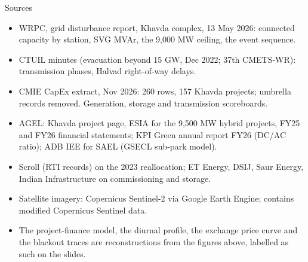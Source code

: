 \documentclass[10pt,aspectratio=169]{beamer}
\begin{document}
\begin{frame}[t]{Sources}
  {\scriptsize
  \begin{itemize}\setlength{\itemsep}{2pt}
    \item WRPC, grid disturbance report, Khavda complex, 13 May 2026: connected capacity by station, SVG MVAr, the 9,000 MW ceiling, the event sequence.
    \item CTUIL minutes (evacuation beyond 15 GW, Dec 2022; 37th CMETS-WR): transmission phases, Halvad right-of-way delays.
    \item CMIE CapEx extract, Nov 2026: 260 rows, 157 Khavda projects; umbrella records removed. Generation, storage and transmission scoreboards.
    \item AGEL: Khavda project page, ESIA for the 9,500 MW hybrid projects, FY25 and FY26 financial statements; KPI Green annual report FY26 (DC/AC ratio); ADB IEE for SAEL (GSECL sub-park model).
    \item Scroll (RTI records) on the 2023 reallocation; ET Energy, DSIJ, Saur Energy, Indian Infrastructure on commissioning and storage.
    \item Satellite imagery: Copernicus Sentinel-2 via Google Earth Engine; contains modified Copernicus Sentinel data.
    \item The project-finance model, the diurnal profile, the exchange price curve and the blackout traces are reconstructions from the figures above, labelled as such on the slides.
  \end{itemize}}
\end{frame}
\end{document}
